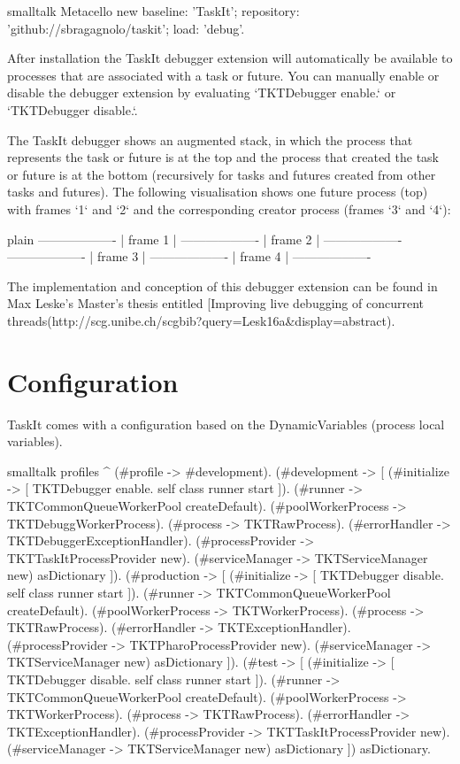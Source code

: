 \documentclass[10pt,twoside,english]{_support/latex/sbabook/sbabook}
\begin{document}
\begin{displaycode}{smalltalk}
Metacello new
  baseline: 'TaskIt';
  repository: 'github://sbragagnolo/taskit';
  load: 'debug'.
\end{displaycode}

After installation the TaskIt debugger extension will automatically be available to processes that are associated with a task or future. You can manually enable or disable the debugger extension by evaluating `TKTDebugger enable.` or `TKTDebugger disable.`.

The TaskIt debugger shows an augmented stack, in which the process that represents the task or future is at the top and the process that created the task or future is at the bottom (recursively for tasks and futures created from other tasks and futures). The following visualisation shows one future process (top) with frames `1` and `2` and the corresponding creator process (frames `3` and `4`):

\begin{displaycode}{plain}
-------------------
|     frame 1     |
-------------------
|     frame 2     |
-------------------
-------------------
|     frame 3     |
-------------------
|     frame 4     |
-------------------
\end{displaycode}

The implementation and conception of this debugger extension can be found in Max Leske's Master's thesis entitled {[}Improving live debugging of concurrent threads\symbol{34}{]}(http://scg.unibe.ch/scgbib?query=Lesk16a\&display=abstract).
\chapter{Configuration}
	TaskIt comes with a configuration based on the DynamicVariables (process local variables). 
	

\begin{displaycode}{smalltalk}
profiles
	^ {(#profile -> #development).
	(#development
		-> [ {(#initialize
				-> [ TKTDebugger enable.
					self class runner start ]).
			(#runner -> TKTCommonQueueWorkerPool createDefault).
			(#poolWorkerProcess -> TKTDebuggWorkerProcess).
			(#process -> TKTRawProcess).
			(#errorHandler -> TKTDebuggerExceptionHandler).
			(#processProvider -> TKTTaskItProcessProvider new).
			(#serviceManager -> TKTServiceManager new)} asDictionary ]).
	(#production
		-> [ {(#initialize
				-> [ TKTDebugger disable.
					self class runner start ]).
			(#runner -> TKTCommonQueueWorkerPool createDefault).
			(#poolWorkerProcess -> TKTWorkerProcess).
			(#process -> TKTRawProcess).
			(#errorHandler -> TKTExceptionHandler).
			(#processProvider -> TKTPharoProcessProvider new).
			(#serviceManager -> TKTServiceManager new)} asDictionary ]).
	(#test
		-> [ {(#initialize
				-> [ TKTDebugger disable.
					self class runner start ]).
			(#runner -> TKTCommonQueueWorkerPool createDefault).
			(#poolWorkerProcess -> TKTWorkerProcess).
			(#process -> TKTRawProcess).
			(#errorHandler -> TKTExceptionHandler).
			(#processProvider -> TKTTaskItProcessProvider new).
			(#serviceManager -> TKTServiceManager new)} asDictionary ])} asDictionary.
\end{displaycode}
\end{document}
